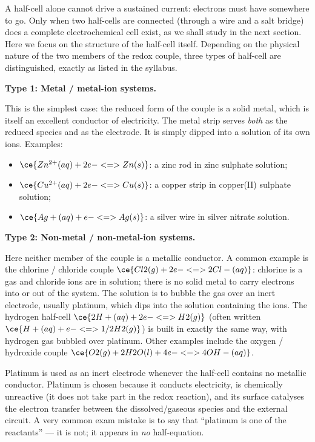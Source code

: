 \documentclass[11pt]{article}
\newcommand{\cle}[1]{{\popxbold\color{popdark}#1}}
\newcounter{popsec}
\newcounter{popsub}
\newcommand{\courssub}[1]{%
  \stepcounter{popsub}%
  \par\vspace{9pt}\noindent{\popxbold\fontsize{11.5}{13}\selectfont\color{popink}{\color{poporange}\thepopsec.\thepopsub}\hspace{6pt}#1}\par\nopagebreak\vspace{4pt}
}
\begin{document}
A half-cell alone cannot drive a sustained current: electrons must have somewhere to go. Only when two half-cells are connected (through a wire and a salt bridge) does a complete electrochemical cell exist, as we shall study in the next section. Here we focus on the structure of the half-cell itself. Depending on the physical nature of the two members of the redox couple, three types of half-cell are distinguished, exactly as listed in the syllabus.

\courssub{The Three Types of Half-Cells}

\textbf{Type 1: Metal / metal-ion systems.}\par
This is the simplest case: the reduced form of the couple is a solid metal, which is itself an excellent conductor of electricity. The metal strip serves \emph{both} as the reduced species and as the electrode. It is simply dipped into a solution of its own ions. Examples:
\begin{itemize}
\item $\ce{Zn^{2+}(aq) + 2e- <=> Zn(s)}$: a zinc rod in zinc sulphate solution;
\item $\ce{Cu^{2+}(aq) + 2e- <=> Cu(s)}$: a copper strip in copper(II) sulphate solution;
\item $\ce{Ag+(aq) + e- <=> Ag(s)}$: a silver wire in silver nitrate solution.
\end{itemize}

\textbf{Type 2: Non-metal / non-metal-ion systems.}\par
Here neither member of the couple is a metallic conductor. A common example is the chlorine / chloride couple $\ce{Cl2(g) + 2e- <=> 2Cl-(aq)}$: chlorine is a gas and chloride ions are in solution; there is no solid metal to carry electrons into or out of the system. The solution is to bubble the gas over an \cle{inert electrode}, usually platinum, which dips into the solution containing the ions. The hydrogen half-cell $\ce{2H+(aq) + 2e- <=> H2(g)}$ (often written $\ce{H+(aq) + e- <=> 1/2 H2(g)}$) is built in exactly the same way, with hydrogen gas bubbled over platinum. Other examples include the oxygen / hydroxide couple $\ce{O2(g) + 2H2O(l) + 4e- <=> 4OH-(aq)}$.

\begin{attention}
Platinum is used as an \cle{inert electrode} whenever the half-cell contains no metallic conductor. Platinum is chosen because it conducts electricity, is chemically unreactive (it does not take part in the redox reaction), and its surface catalyses the electron transfer between the dissolved/gaseous species and the external circuit. A very common exam mistake is to say that ``platinum is one of the reactants'' --- it is not; it appears in \emph{no} half-equation.
\end{attention}
\end{document}
